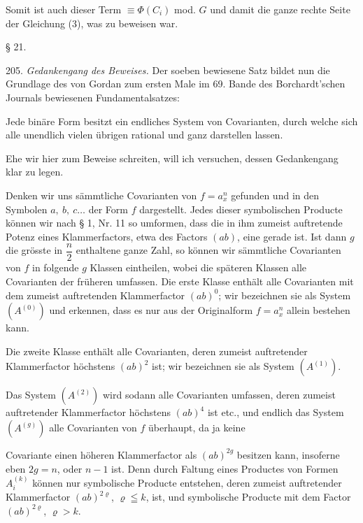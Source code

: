 Somit ist auch dieser Term $\equiv \Phi(C_i)$ mod. $G$ und damit die
ganze rechte Seite der Gleichung (3), was zu beweisen war.

§ 21. 

205. \textit{Gedankengang des Beweises.} Der soeben bewiesene Satz
bildet nun die Grundlage des von Gordan zum ersten Male im 69. Bande des
Borchardt'schen Journals bewiesenen Fundamentalsatzes:

\glqq Jede binäre Form besitzt ein endliches System von Covarianten,
durch welche sich alle unendlich vielen übrigen rational und ganz
darstellen lassen.\grqq{}

Ehe wir hier zum Beweise schreiten, will ich versuchen, dessen
Gedankengang klar zu legen.

Denken wir uns sämmtliche Covarianten von $f=a_x^n$ gefunden und in den
Symbolen $a,\ b,\ c\ldots$ der Form $f$ dargestellt. Jedes dieser
symbolischen Producte können wir nach § 1, Nr. 11 so umformen, dass die
in ihm zumeist auftretende Potenz eines Klammerfactors, etwa des
Factors $(ab)$, eine gerade ist. Ist dann $g$ die grösste in
$\dfrac{n}{2}$ enthaltene ganze Zahl, so können wir sämmtliche
Covarianten von $f$ in folgende $g$ Klassen eintheilen, wobei die
späteren Klassen alle Covarianten der früheren umfassen. Die erste
Klasse enthält alle Covarianten mit dem zumeist auftretenden
Klammerfactor $(ab)^0$; wir bezeichnen sie als System $(A^{(0)})$ und
erkennen, dass es nur aus der Originalform $f=a_x^n$ allein bestehen
kann.

Die zweite Klasse enthält alle Covarianten, deren zumeist auftretender
Klammerfactor höchstens $(ab)^2$ ist; wir bezeichnen sie als System
$(A^{(1)})$.

Das System $(A^{(2)})$ wird sodann alle Covarianten umfassen, deren
zumeist auftretender Klammerfactor höchstens $(ab)^4$ ist etc., und
endlich das System $(A^{(g)})$ alle Covarianten von $f$ überhaupt, da ja
keine


Covariante einen höheren Klammerfactor als $(ab)^{2g}$ besitzen kann,
insoferne eben $2g=n$, oder $n-1$ ist.  Denn durch Faltung eines
Productes von Formen $A_i^{(k)}$ können nur symbolische Producte
entstehen, deren zumeist auftretender Klammerfactor $(ab)^{2\varrho}$,
$\varrho \leqq k$, ist, und symbolische Producte mit dem Factor
$(ab)^{2\varrho}$, $\varrho > k$.

